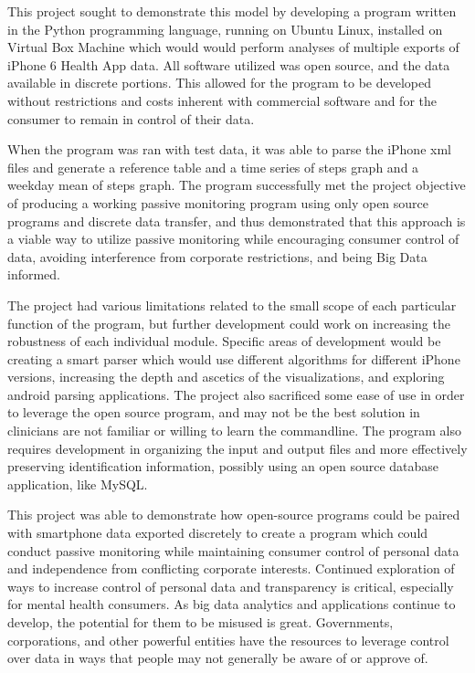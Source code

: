\documentclass[sigconf]{acmart}
\begin{document}
This project sought to demonstrate this model by developing a program  written in the Python programming language, running on Ubuntu Linux, installed on Virtual Box Machine which would would perform analyses of multiple exports of iPhone 6 Health App data. All software utilized was open source, and the data available in discrete portions. This allowed for the program to be developed without restrictions and costs inherent with commercial software and for the consumer to remain in control of their data.

When the program was ran with test data, it was able to parse the iPhone xml files and generate a reference table and a time series of steps graph and a weekday mean of steps graph. The program successfully met the project objective of producing a working passive monitoring program using only open source programs and discrete data transfer, and thus demonstrated that this approach is a viable way to utilize passive monitoring while encouraging consumer control of data, avoiding interference from corporate restrictions, and being Big Data informed. 

The project had various limitations related to the small scope of each particular function of the program, but further development could work on increasing the robustness of each individual module. Specific areas of development would be creating a smart parser which would use different algorithms for different iPhone versions, increasing the depth and ascetics of the visualizations, and exploring android parsing applications. 
The project also sacrificed some ease of use in order to leverage the open source program, and may not be the best solution in clinicians are not familiar or willing to learn the commandline. The program also requires development in organizing the input and output files and more effectively preserving identification information, possibly using an open source database application, like MySQL. 

This project was able to demonstrate how open-source programs could be paired with smartphone data exported discretely to create a program which could conduct passive monitoring while maintaining consumer control of personal data and independence from conflicting corporate interests. Continued exploration of ways to increase control of personal data and transparency is critical, especially for mental health consumers. As big data analytics and applications continue to develop, the potential for them to be misused is great. Governments, corporations, and other powerful entities have the resources to leverage control over data in ways that people may not generally be aware of or approve of. 
\end{document}
